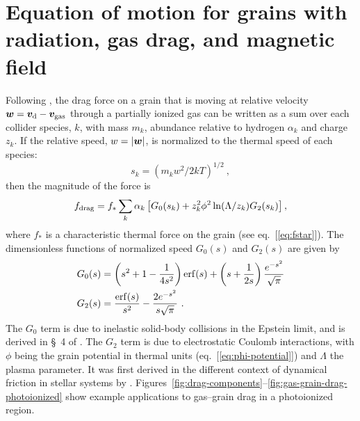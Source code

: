\section{Equation of motion for grains with radiation, gas drag, and
  magnetic field}
\label{sec:equat-moti-grains}

Following \citet{Draine:1979a}, the drag force on a grain that is
moving at relative velocity \(\bm{w} = \bm{v}_{\text{d}} - \bm{v}_{\text{gas}}\)
through a partially ionized gas can be written as a sum over each
collider species, \(k\), with mass \(m_k\), abundance relative to
hydrogen \(\alpha_k\) and charge \(z_k\). If the relative speed,
\(w = \lvert\bm{w}\rvert\), is normalized to the thermal speed of each
species:
\begin{equation}
  \label{eq:s-velocity}
  s_k = \left( m_k w^2 / 2 k T  \right)^{1/2} \ ,
\end{equation}
then the magnitude of the force is 
\begin{equation}
  \label{eq:ds79}
  f_{\text{drag}} = f_* \sum_k \alpha_k \left[ G_0(s_k) + z_k^2 \phi^2 \ln(\Lambda/z_k) G_2(s_k) \right],
\end{equation}
where \(f_*\) is a characteristic thermal force on the grain (see
eq.~[\ref{eq:fstar}]). The dimensionless functions of normalized speed
\(G_0(s)\) and \(G_2(s)\) are given by
\begin{align}
  \label{eq:G0}
  G_0(s) & = \left( s^2 + 1 - \frac{1}{4 s^2} \right) \erf(s)
  +  \left( s + \frac{1}{2 s} \right) \frac{e^{-s^2}}{\sqrt{\pi}}\\
  \label{eq:G2}
  G_2(s) & = \frac{\erf(s)}{s^2} - \frac{2 e^{-s^2}}{s \sqrt{\pi}} \ .
\end{align}
The \(G_0\) term is due to inelastic solid-body collisions in the
Epstein limit, and is derived in \S~4 of \citet{Baines:1965a}.  The
\(G_2\) term is due to electrostatic Coulomb interactions, with
\(\phi\) being the grain potential in thermal units
(eq.~[\ref{eq:phi-potential}]) and \(\Lambda\) the plasma parameter.  It was
first derived in the different context of dynamical friction in
stellar systems by \citet{Chandrasekhar:1941a}.
Figures~\ref{fig:drag-components}--\ref{fig:gas-grain-drag-photoionized}
show example applications to gas--grain drag in a photoionized region.

